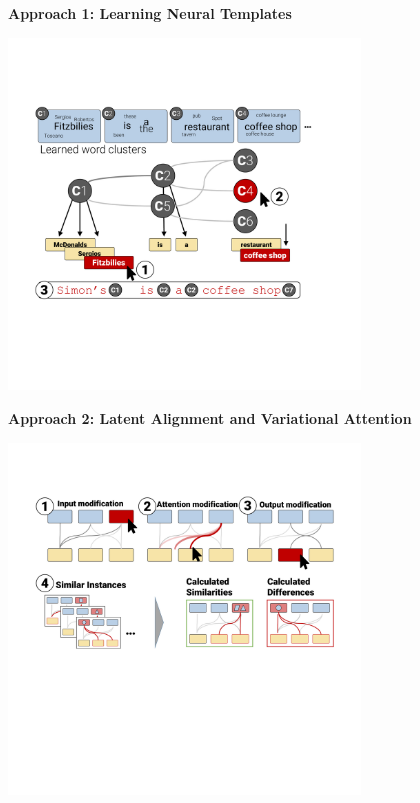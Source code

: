 \documentclass[aspectratio=169]{beamer}
\begin{document}
\begin{frame}
  \begin{center}
    \textbf{Approach 1: Learning Neural Templates}
  \end{center}

  \begin{center}
    \includegraphics[width=0.7\textwidth]{DecoderVis}
  \end{center}
\end{frame}

\begin{frame}
  \begin{center}
    \textbf{Approach 2: Latent Alignment and Variational Attention}
  \end{center}

  \begin{center}
    \includegraphics[width=0.7\textwidth]{AttentionVIS}
  \end{center}
\end{frame}
\end{document}
